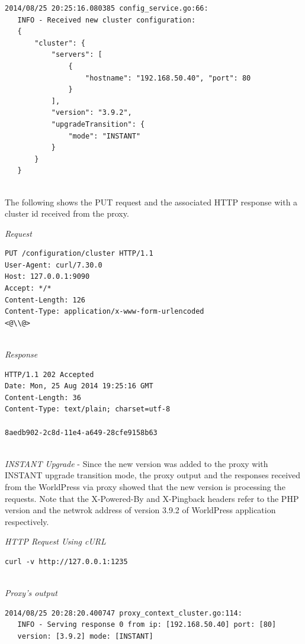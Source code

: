 \documentclass[a4paper,11pt,twoside]{article}
\begin{document}
\begin{lstlisting}[language=terminal] 
2014/08/25 20:25:16.080385 config_service.go:66:     
   INFO - Received new cluster configuration:
   {
       "cluster": {
           "servers": [
               {
                   "hostname": "192.168.50.40", "port": 80
               }
           ],
           "version": "3.9.2",
           "upgradeTransition": {
               "mode": "INSTANT"
           }
       }
   } 
\end{lstlisting}   

\noindent\\
The following shows the PUT request and the associated HTTP response with a cluster id received from the proxy.\smallskip 

\noindent
\textit{Request}
\begin{lstlisting}[language=terminal]
PUT /configuration/cluster HTTP/1.1
User-Agent: curl/7.30.0
Host: 127.0.0.1:9090
Accept: */*
Content-Length: 126
Content-Type: application/x-www-form-urlencoded
<@\\@>
\end{lstlisting}

\noindent\\
\textit{Response}
\begin{lstlisting}[language=terminal]
HTTP/1.1 202 Accepted
Date: Mon, 25 Aug 2014 19:25:16 GMT
Content-Length: 36
Content-Type: text/plain; charset=utf-8

8aedb902-2c8d-11e4-a649-28cfe9158b63
\end{lstlisting}  

\noindent\\
\textit{INSTANT Upgrade} - Since the new version was added to the proxy with INSTANT upgrade transition mode, the proxy output and the responses received from the WorldPress via proxy showed that the new version is processing the requests. Note that the X-Powered-By and X-Pingback headers refer to the PHP version and the netwrok address of version 3.9.2 of WorldPress application respectively. \smallskip 


\noindent
\textit{HTTP Request Using cURL}
\begin{lstlisting}[language=terminal]
curl -v http://127.0.0.1:1235
\end{lstlisting}

\noindent\\
\textit{Proxy's output}
\begin{lstlisting}[language=terminal]
2014/08/25 20:28:20.400747 proxy_context_cluster.go:114:     
   INFO - Serving response 0 from ip: [192.168.50.40] port: [80] 
   version: [3.9.2] mode: [INSTANT]
\end{lstlisting}
\end{document}
